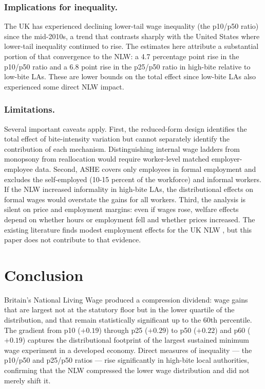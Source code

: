 \documentclass[12pt]{article}
\begin{document}
\subsubsection*{Implications for inequality.}
The UK has experienced declining lower-tail wage inequality (the p10/p50 ratio) since the mid-2010s, a trend that contrasts sharply with the United States where lower-tail inequality continued to rise. The estimates here attribute a substantial portion of that convergence to the NLW: a 4.7 percentage point rise in the p10/p50 ratio and a 6.8 point rise in the p25/p50 ratio in high-bite relative to low-bite LAs. These are lower bounds on the total effect since low-bite LAs also experienced some direct NLW impact.

\subsubsection*{Limitations.}
Several important caveats apply. First, the reduced-form design identifies the total effect of bite-intensity variation but cannot separately identify the contribution of each mechanism. Distinguishing internal wage ladders from monopsony from reallocation would require worker-level matched employer-employee data. Second, ASHE covers only employees in formal employment and excludes the self-employed (10-15 percent of the workforce) and informal workers. If the NLW increased informality in high-bite LAs, the distributional effects on formal wages would overstate the gains for all workers. Third, the analysis is silent on price and employment margins: even if wages rose, welfare effects depend on whether hours or employment fell and whether prices increased. The existing literature finds modest employment effects for the UK NLW \citep{dube2019minimum, lpc2023report}, but this paper does not contribute to that evidence.

\section{Conclusion}
\label{sec:conclusion}

Britain's National Living Wage produced a compression dividend: wage gains that are largest not at the statutory floor but in the lower quartile of the distribution, and that remain statistically significant up to the 60th percentile. The gradient from p10 ($+0.19$) through p25 ($+0.29$) to p50 ($+0.22$) and p60 ($+0.19$) captures the distributional footprint of the largest sustained minimum wage experiment in a developed economy. Direct measures of inequality --- the p10/p50 and p25/p50 ratios --- rise significantly in high-bite local authorities, confirming that the NLW compressed the lower wage distribution and did not merely shift it.
\end{document}

